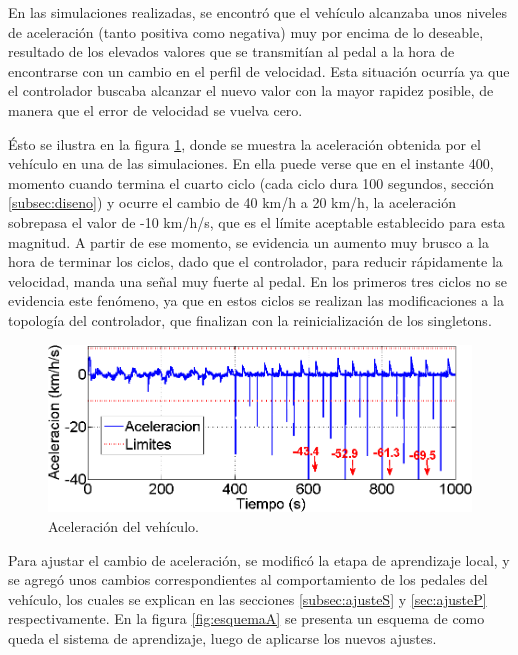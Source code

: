 En las simulaciones realizadas, se encontró que el vehículo alcanzaba unos niveles de aceleración (tanto positiva como negativa) muy por encima de lo deseable, resultado de los elevados valores que se transmitían al pedal a la hora de encontrarse con un cambio en el perfil de velocidad. Esta situación ocurría ya que el controlador buscaba alcanzar el nuevo valor con la mayor rapidez posible, de manera que el error de velocidad se vuelva cero. 

Ésto se ilustra en la figura \ref{fig:frenaso}, donde se muestra la aceleración obtenida por el vehículo en una de las simulaciones. En ella puede verse que en el instante 400, momento cuando termina el cuarto ciclo (cada ciclo dura 100 segundos, sección \ref{subsec:diseno}) y ocurre el cambio de 40 km/h a 20 km/h, la aceleración sobrepasa el valor de -10 km/h/s, que es el límite aceptable establecido para esta magnitud. A partir de ese momento, se evidencia un aumento muy brusco a la hora de terminar los ciclos, dado que el controlador, para reducir rápidamente la velocidad, manda una señal muy fuerte al pedal. En los primeros tres ciclos no se evidencia este fenómeno, ya que en estos ciclos se realizan las modificaciones a la topología del controlador, que finalizan con la reinicialización de los singletons. 

\begin{figure}[h]
\centering
\includegraphics[width=0.6\linewidth,type=png,ext=.png,read=.png]{figures/frenaso}
\caption{Aceleración del vehículo.}
\label{fig:frenaso}
\end{figure} 

Para ajustar el cambio de aceleración, se modificó la etapa de aprendizaje local, y se agregó unos cambios correspondientes al comportamiento de los pedales del vehículo, los cuales se explican en las secciones \ref{subsec:ajusteS} y \ref{sec:ajusteP} respectivamente. En la figura \ref{fig:esquemaA} se presenta un esquema de como queda el sistema de aprendizaje, luego de aplicarse los nuevos ajustes.  

